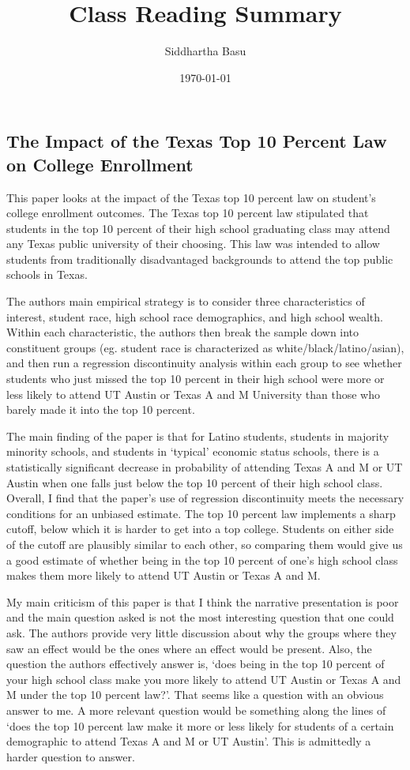 \documentclass[12 pt, leqno]{article}
\begin{document}
\title{Class Reading Summary}
\author{Siddhartha Basu}
\date{\today}
\maketitle

\subsection*{The Impact of the Texas Top 10 Percent Law on College Enrollment}

This paper looks at the impact of the Texas top 10 percent law on student's college enrollment outcomes. The Texas top 10 percent law stipulated that students in the top 10 percent of their high school graduating class may attend any Texas public university of their choosing. This law was intended to allow students from traditionally disadvantaged backgrounds to attend the top public schools in Texas.

The authors main empirical strategy is to consider three characteristics of interest, student race, high school race demographics, and high school wealth. Within each characteristic, the authors then break the sample down into constituent groups (eg. student race is characterized as white/black/latino/asian), and then run a regression discontinuity analysis within each group to see whether students who just missed the top 10 percent in their high school were more or less likely to attend UT Austin or Texas A and M University than those who barely made it into the top 10 percent.

The main finding of the paper is that for Latino students, students in majority minority schools, and students in `typical' economic status schools, there is a statistically significant decrease in probability of attending Texas A and M or UT Austin when one falls just below the top 10 percent of their high school class. Overall, I find that the paper's use of regression discontinuity meets the necessary conditions for an unbiased estimate. The top 10 percent law implements a sharp cutoff, below which it is harder to get into a top college. Students on either side of the cutoff are plausibly similar to each other, so comparing them would give us a good estimate of whether being in the top 10 percent of one's high school class makes them more likely to attend UT Austin or Texas A and M.

My main criticism of this paper is that I think the narrative presentation is poor and the main question asked is not the most interesting question that one could ask. The authors provide very little discussion about why the groups where they saw an effect would be the ones where an effect would be present. Also, the question the authors effectively answer is, `does being in the top 10 percent of your high school class make you more likely to attend UT Austin or Texas A and M under the top 10 percent law?'. That seems like a question with an obvious answer to me. A more relevant question would be something along the lines of `does the top 10 percent law make it more or less likely for students of a certain demographic to attend Texas A and M or UT Austin'. This is admittedly a harder question to answer. 
\end{document}
